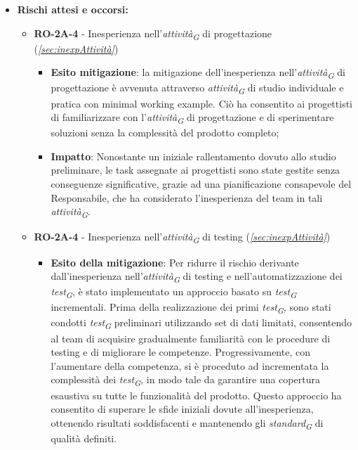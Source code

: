 \begin{itemize}
    \item \textbf{Rischi attesi e occorsi:}
\begin{itemize}
    \item \textbf{RO-2A-4} - Inesperienza nell'\textit{attività}\textsubscript{\textit{G}} di progettazione (\textit{\ref{sec:inexpAttività}})
        \begin{itemize}
            \item \textbf{Esito mitigazione}: 
            la mitigazione dell'inesperienza nell'\textit{attività}\textsubscript{\textit{G}} di progettazione è avvenuta attraverso \textit{attività}\textsubscript{\textit{G}} di studio individuale e pratica con minimal working example. Ciò ha consentito ai progettisti di familiarizzare con l'\textit{attività}\textsubscript{\textit{G}} di progettazione e di sperimentare soluzioni senza la complessità del prodotto completo;
            \item \textbf{Impatto}: Nonostante un iniziale rallentamento dovuto allo studio preliminare, le task assegnate ai progettisti sono state gestite senza conseguenze significative, grazie ad una pianificazione consapevole del Responsabile, che ha considerato l'inesperienza del team in tali \textit{attività}\textsubscript{\textit{G}}.
        \end{itemize}
    \item \textbf{RO-2A-4} - Inesperienza nell'\textit{attività}\textsubscript{\textit{G}} di testing (\textit{\ref{sec:inexpAttività}})
        \begin{itemize}
            \item \textbf{Esito della mitigazione}: Per ridurre il rischio derivante dall'inesperienza nell'\textit{attività}\textsubscript{\textit{G}} di testing e nell'automatizzazione dei \textit{test}\textsubscript{\textit{G}}, è stato implementato un approccio basato su \textit{test}\textsubscript{\textit{G}} incrementali. Prima della realizzazione dei primi \textit{test}\textsubscript{\textit{G}}, sono stati condotti \textit{test}\textsubscript{\textit{G}} preliminari utilizzando set di dati limitati, consentendo al team di acquisire gradualmente familiarità con le procedure di testing e di migliorare le competenze. Progressivamente, con l'aumentare della competenza, si è proceduto ad incrementata la complessità dei \textit{test}\textsubscript{\textit{G}}, in modo tale da garantire una copertura esaustiva su tutte le funzionalità del prodotto. Questo approccio ha consentito di superare le sfide iniziali dovute all'inesperienza, ottenendo risultati soddisfacenti e mantenendo gli \textit{standard}\textsubscript{\textit{G}} di qualità definiti.

\end{itemize}
\end{itemize}
\end{itemize}
